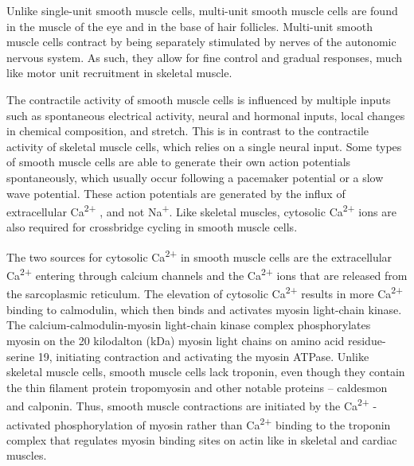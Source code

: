 Unlike single-unit smooth muscle cells, multi-unit smooth muscle cells are found in the muscle of the eye and in the base of hair follicles. Multi-unit smooth muscle cells contract by being separately stimulated by nerves of the autonomic nervous system. As such, they allow for fine control and gradual responses, much like motor unit recruitment in skeletal muscle.

The contractile activity of smooth muscle cells is influenced by multiple inputs such as spontaneous electrical activity, neural and hormonal inputs, local changes in chemical composition, and stretch. This is in contrast to the contractile activity of skeletal muscle cells, which relies on a single neural input. Some types of smooth muscle cells are able to generate their own action potentials spontaneously, which usually occur following a pacemaker potential or a slow wave potential. These action potentials are generated by the influx of extracellular Ca\textsuperscript{2+} , and not Na\textsuperscript{+}. Like skeletal muscles, cytosolic Ca\textsuperscript{2+} ions are also required for crossbridge cycling in smooth muscle cells.

The two sources for cytosolic Ca\textsuperscript{2+} in smooth muscle cells are the extracellular Ca\textsuperscript{2+} entering through calcium channels and the Ca\textsuperscript{2+} ions that are released from the sarcoplasmic reticulum. The elevation of cytosolic Ca\textsuperscript{2+} results in more Ca\textsuperscript{2+} binding to calmodulin, which then binds and activates myosin light-chain kinase. The calcium-calmodulin-myosin light-chain kinase complex phosphorylates myosin on the 20 kilodalton (kDa) myosin light chains on amino acid residue-serine 19, initiating contraction and activating the myosin ATPase. Unlike skeletal muscle cells, smooth muscle cells lack troponin, even though they contain the thin filament protein tropomyosin and other notable proteins -- caldesmon and calponin. Thus, smooth muscle contractions are initiated by the Ca\textsuperscript{2+} -activated phosphorylation of myosin rather than Ca\textsuperscript{2+} binding to the troponin complex that regulates myosin binding sites on actin like in skeletal and cardiac muscles.

